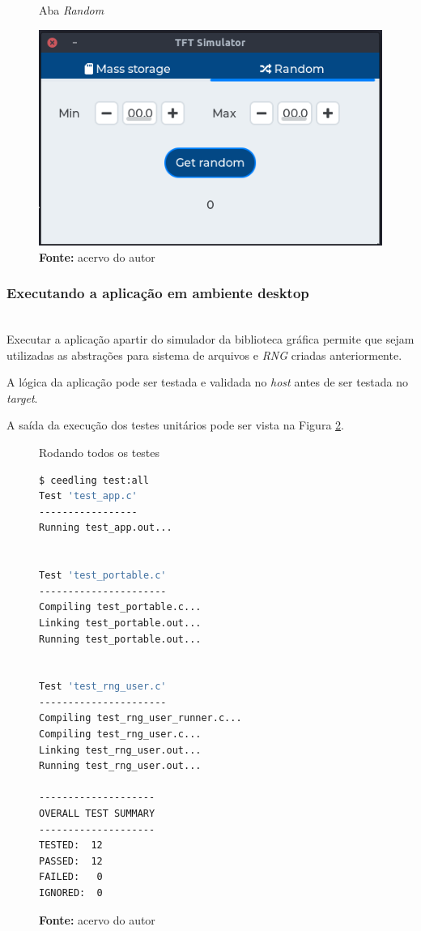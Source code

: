 \documentclass[times, twoside, watermark]{artigo}
\begin{document}
\begin{figure}[H]
  \centering
  
  \caption{Aba \textit{Random}}
  \includegraphics[width=0.95\linewidth]{images/random-screen.png}
  \caption*{\newline\textbf{Fonte:} acervo do autor}
  \label{fig:random}
\end{figure}

\subsubsection{Executando a aplicação em ambiente desktop}\hfill\\

Executar a aplicação apartir do simulador da biblioteca gráfica permite que sejam
utilizadas as abstrações para sistema de arquivos e \textit{RNG} criadas 
anteriormente.

A lógica da aplicação pode ser testada e validada no \textit{host} antes de ser
testada no \textit{target}.

A saída da execução dos testes unitários pode ser vista na 
Figura \ref{fig:ceedling-output-all}.\hfill\

\begin{figure}[H]
  \centering
  \caption{Rodando todos os testes}
\begin{lstlisting}[language=bash]
$ ceedling test:all
Test 'test_app.c'
-----------------
Running test_app.out...


Test 'test_portable.c'
----------------------
Compiling test_portable.c...
Linking test_portable.out...
Running test_portable.out...


Test 'test_rng_user.c'
----------------------
Compiling test_rng_user_runner.c...
Compiling test_rng_user.c...
Linking test_rng_user.out...
Running test_rng_user.out...

--------------------
OVERALL TEST SUMMARY
--------------------
TESTED:  12
PASSED:  12
FAILED:   0
IGNORED:  0
\end{lstlisting}
  \label{fig:ceedling-output-all}
  \caption*{\newline\textbf{Fonte:} acervo do autor}
\end{figure}
\end{document}
